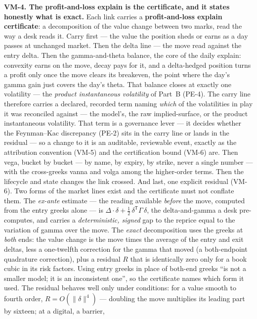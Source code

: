 \documentclass[11pt,a4paper]{article}
\newcommand{\vlabel}[1]{\leavevmode\hypertarget{vm-#1}{}%
  \marginpar{\raggedright\scriptsize\ttfamily\textcolor{gray}{#1}}}
\begin{document}
\vlabel{VM-4}\textbf{VM-4. The profit-and-loss explain is the certificate,
and it states honestly what is exact.} Each link carries a
\textbf{profit-and-loss explain certificate}: a decomposition of the value
change between two marks, read the way a desk reads it. Carry first --- the
value the position sheds or earns as a day passes at unchanged market.
Then the delta line --- the move read against the entry delta. Then the
gamma-and-theta balance, the core of the daily explain: convexity earns on
the move, decay pays for it, and a delta-hedged position turns a profit
only once the move clears its breakeven, the point where the day's gamma
gain just covers the day's theta. That balance closes at exactly one
volatility --- the \emph{product instantaneous volatility} of Part~B (PE-4).
The carry line therefore carries a declared, recorded term naming \emph{which}
of the volatilities in play it was reconciled against --- the model's, the raw
implied-surface, or the product instantaneous volatility. That term is a
governance lever --- it decides whether the Feynman--Kac discrepancy (PE-2) sits
in the carry line or lands in the residual --- so a change to it is an auditable,
reviewable event, exactly as the attribution convention (VM-5) and the
certification bound (VM-6) are. Then vega, bucket by bucket --- by name,
by expiry, by strike, never a single number --- with the cross-greeks
vanna and volga among the higher-order terms. Then the lifecycle and
state changes the link crossed. And last, one explicit residual (VM-6).
Two forms of the market lines exist and the certificate must not conflate
them. The \emph{ex-ante} estimate --- the reading available \emph{before}
the move, computed from the entry greeks alone --- is
$\Delta\!\cdot\!\delta + \tfrac12\,\delta^{\mathsf T}\Gamma\,\delta$, the
delta-and-gamma a desk pre-computes, and carries a
\emph{deterministic, signed} gap to the reprice equal to the variation of
gamma over the move. The \emph{exact} decomposition uses the greeks at
\emph{both} ends: the value change is the move times the average of the
entry and exit deltas, less a one-twelfth correction for the gamma that
moved (a both-endpoint quadrature correction), plus a residual $R$ that is
identically zero only for a book cubic
in its risk factors. Using entry greeks in place of both-end greeks ``is
not a smaller model; it is an inconsistent one'', so the certificate names
which form it used. The residual behaves well only under conditions: for a
value smooth to fourth order, $R = O(\lVert\delta\rVert^4)$ --- doubling
the move multiplies its leading part by sixteen; at a digital, a barrier,
\end{document}
